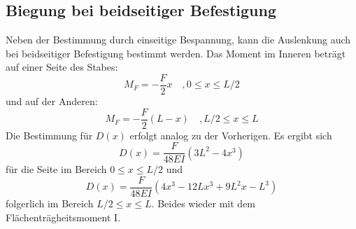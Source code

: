 \subsection{Biegung bei beidseitiger Befestigung}
Neben der Bestimmung durch einseitige Bespannung, kann die Auslenkung auch bei
beidseitiger Befestigung bestimmt werden. Das Moment im Inneren beträgt auf einer
Seite des Stabes:
\begin{equation}
    M_F = -\frac{F}{2} x \quad , 0 \leq x \leq L/2
\end{equation}
und auf der Anderen:
\begin{equation}
    M_F = -\frac{F}{2} (L-x) \quad , L/2 \leq x \leq L
\end{equation}
Die Bestimmung für $D(x)$ erfolgt analog zu der Vorherigen. Es ergibt sich
\begin{equation}
    \label{eqn:linksDx}
    D(x)=\frac{F}{48EI} (3L^2-4x^3)
\end{equation}
für die Seite im Bereich $0 \leq x \leq L/2$ und 
\begin{equation}
    \label{eqn:RechtsDx}
    D(x)=\frac{F}{48EI} (4x^3-12Lx^3+9L^2x-L^3)
\end{equation}
folgerlich im Bereich $L/2 \leq x \leq L$. Beides wieder mit dem Flächenträgheitsmoment I.


\cite{sample}
